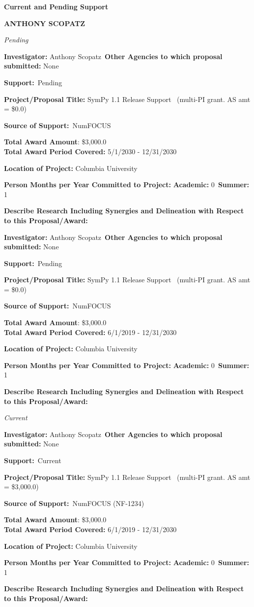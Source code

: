 \documentclass[prl,tighten,amsmath,amssymb,floatfix]{revtex4-1}
\begin{document}
\textbf{Current and Pending Support}

\textbf{ANTHONY SCOPATZ}
\vskip 14pt


\textit{Pending}

\vskip 12pt\noindent
\textbf{Investigator:} Anthony Scopatz\
\textbf{Other Agencies to which proposal submitted:}
None

\textbf{Support:}\ Pending

\textbf{Project/Proposal Title:}  SymPy 1.1 Release Support
\ (multi-PI grant.  AS
amt = \$0.0)

\textbf{Source of Support:}\
NumFOCUS

\textbf{Total Award Amount}:
\$3,000.0\\
\textbf{ Total Award Period Covered:}
5/1/2030 - 12/31/2030

\textbf{Location of Project:} Columbia University

\textbf{Person Months per Year Committed to Project:}
\textbf{Academic:} 0\
\textbf{Summer:} 1

\textbf{Describe Research Including Synergies and Delineation with
Respect to this Proposal/Award:}

\vskip 12pt\noindent
\textbf{Investigator:} Anthony Scopatz\
\textbf{Other Agencies to which proposal submitted:}
None

\textbf{Support:}\ Pending

\textbf{Project/Proposal Title:}  SymPy 1.1 Release Support
\ (multi-PI grant.  AS
amt = \$0.0)

\textbf{Source of Support:}\
NumFOCUS

\textbf{Total Award Amount}:
\$3,000.0\\

\textbf{ Total Award Period Covered:}
6/1/2019 - 12/31/2030

\textbf{Location of Project:} Columbia University

\textbf{Person Months per Year Committed to Project:}
\textbf{Academic:} 0\
\textbf{Summer:} 1

\textbf{Describe Research Including Synergies and Delineation with
Respect to this Proposal/Award:}

\vskip 14pt


\textit{Current}

\vskip 12pt\noindent
\textbf{Investigator:} Anthony Scopatz\
\textbf{Other Agencies to which proposal submitted:}
None

\textbf{Support:}\ Current

\textbf{Project/Proposal Title:}  SymPy 1.1 Release Support
\ (multi-PI grant.  AS
amt = \$3,000.0)


\textbf{Source of Support:}\
NumFOCUS
(NF-1234)

\textbf{Total Award Amount}:
\$3,000.0\\
\textbf{ Total Award Period Covered:}
6/1/2019 - 12/31/2030

\textbf{Location of Project:} Columbia University

\textbf{Person Months per Year Committed to Project:}
\textbf{Academic:} 0\
\textbf{Summer:} 1

\textbf{Describe Research Including Synergies and Delineation with
Respect to this Proposal/Award:}

\vskip 14pt
\end{document}
